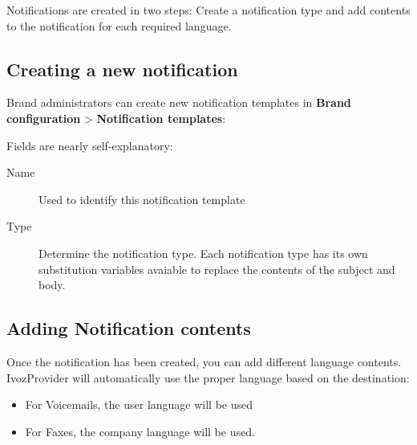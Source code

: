 \documentclass[letterpaper,10pt,english]{sphinxmanual}
\begin{document}
Notifications are created in two steps: Create a notification type and add contents to the notification for each
required language.


\subsection{Creating a new notification}
\label{brand/notifications:creating-a-new-notification}
Brand administrators can create new notification templates in \textbf{Brand configuration} \textgreater{} \textbf{Notification templates}:

Fields are nearly self-explanatory:
\begin{description}
\item[{Name}] \leavevmode{}\label{brand/notifications:term-name}
Used to identify this notification template

\item[{Type}] \leavevmode{}\label{brand/notifications:term-type}
Determine the notification type. Each notification type has its own substitution variables avaiable to replace
the contents of the subject and body.

\end{description}


\subsection{Adding Notification contents}
\label{brand/notifications:adding-notification-contents}
Once the notification has been created, you can add different language contents. IvozProvider will automatically use
the proper language based on the destination:
\begin{itemize}
\item {} 
For Voicemails, the user language will be used

\item {} 
For Faxes, the company language will be used.

\end{itemize}
\end{document}
